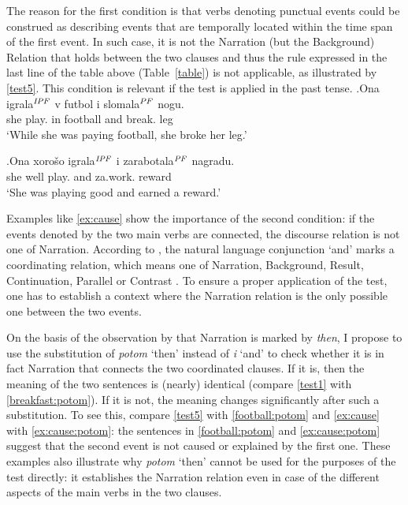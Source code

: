 The reason for the first condition is that verbs denoting punctual events could be construed as describing events that are temporally located within the time span of the first event. In such case, it is not the Narration (but the Background) Relation that holds between the two clauses and thus the rule expressed in the last line of the table above (Table~\ref{table}) is not applicable, as illustrated by \ref{test5}. This condition is relevant if the test is applied in the past tense.
\exg.\label{test5}Ona igrala$^{\mathit{IPF}}$ v futbol i slomala$^{\mathit{PF}}$ nogu.\\
she play. in football and break. leg\\
\vspace{0.5em}
`While she was paying football, she broke her leg.'

\exg.\label{ex:cause}Ona xoro\v{s}o igrala$^{\mathit{IPF}}$ i zarabotala$^{\mathit{PF}}$ nagradu.\\
she well play. and za.work. reward\\
\vspace{0.5em}
`She was playing good and earned a reward.'

Examples like \ref{ex:cause} show the importance of the second condition: if the events denoted by the two main verbs are connected, the discourse relation is not one of Narration. According to \citet{Txurruka:03}, the natural language conjunction `and' marks a coordinating relation, which means one of Narration, Background, Result, Continuation, Parallel or Contrast \citep{Asher:05}. To ensure a proper application of the test, one has to establish a context where the Narration relation is the only possible one between the two events. 

On the basis of the observation by \citet{Txurruka:03} that Narration is marked by \textit{then}, I propose to use the substitution of \textit{potom} `then' instead of \textit{i} `and' to check whether it is in fact Narration that connects the two coordinated clauses. If it is, then the meaning of the two sentences is (nearly) identical (compare \ref{test1} with \ref{breakfast:potom}). If it is not, the meaning changes significantly after such a substitution. To see this, compare \ref{test5} with \ref{football:potom} and \ref{ex:cause} with \ref{ex:cause:potom}: the sentences in \ref{football:potom} and \ref{ex:cause:potom} suggest that the second event is not caused or explained by the first one. These examples also illustrate why \textit{potom} `then' cannot be used for the purposes of the test directly: it establishes the Narration relation even in case of the different aspects of the main verbs in the two clauses.

